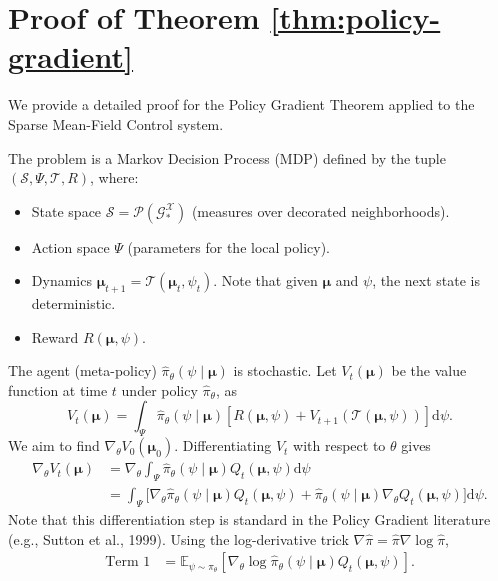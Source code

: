 \documentclass{article}
\begin{document}
\section{Proof of Theorem \ref{thm:policy-gradient}}
\label{app:proof_pg}

We provide a detailed proof for the Policy Gradient Theorem applied to the Sparse Mean-Field Control system.

The problem is a Markov Decision Process (MDP) defined by the tuple $(\mathcal{S}, \Psi, \mathcal{T}, R)$, where:
\begin{itemize}
    \item State space $\mathcal{S} = \mathcal{P}(\mathcal{G}_*^{\mathcal{X}})$ (measures over decorated neighborhoods).
    \item Action space $\Psi$ (parameters for the local policy).
    \item Dynamics $\boldsymbol{\mu}_{t+1} = \mathcal{T}(\boldsymbol{\mu}_t, \psi_t)$. Note that given $\boldsymbol{\mu}$ and $\psi$, the next state is deterministic.
    \item Reward $R(\boldsymbol{\mu}, \psi)$.
\end{itemize}
The agent (meta-policy) $\hat{\pi}_\theta(\psi \mid \boldsymbol{\mu})$ is stochastic.
Let $V_t(\boldsymbol{\mu})$ be the value function at time $t$ under policy $\hat{\pi}_\theta$, as
\[ V_t(\boldsymbol{\mu}) = \int_{\Psi} \hat{\pi}_\theta(\psi \mid \boldsymbol{\mu}) \left[ R(\boldsymbol{\mu}, \psi) + V_{t+1}(\mathcal{T}(\boldsymbol{\mu}, \psi)) \right] \mathrm{d}\psi. \]
We aim to find $\nabla_\theta V_0(\boldsymbol{\mu}_0)$. Differentiating $V_t$ with respect to $\theta$ gives
\begin{align}
    \nabla_\theta V_t(\boldsymbol{\mu}) &= \nabla_\theta \int_{\Psi} \hat{\pi}_\theta(\psi \mid \boldsymbol{\mu}) Q_t(\boldsymbol{\mu}, \psi) \mathrm{d}\psi \nonumber \\
    &= \int_{\Psi} \Big[ \nabla_\theta \hat{\pi}_\theta(\psi \mid \boldsymbol{\mu}) Q_t(\boldsymbol{\mu}, \psi) \nonumber + \hat{\pi}_\theta(\psi \mid \boldsymbol{\mu}) \nabla_\theta Q_t(\boldsymbol{\mu}, \psi) \Big] \mathrm{d}\psi. \label{eq:pg_expansion}
\end{align}
Note that this differentiation step is standard in the Policy Gradient literature (e.g., Sutton et al., 1999).
Using the log-derivative trick $\nabla \hat{\pi} = \hat{\pi} \nabla \log \hat{\pi}$,
\begin{align}
    \text{Term 1} &= \mathbb{E}_{\psi \sim \hat{\pi}_\theta} \left[ \nabla_\theta \log \hat{\pi}_\theta(\psi \mid \boldsymbol{\mu}) Q_t(\boldsymbol{\mu}, \psi) \right].
\end{align}
\end{document}

